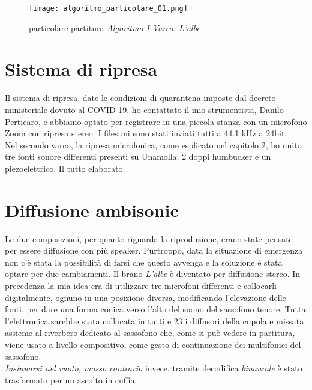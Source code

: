 \begin{figure}

\begin{center}

\texttt{[image: algoritmo\_particolare\_01.png]}

\caption{particolare partitura \textit{Algoritmo I Varco: L'albe}}

\label{fig:02_Algoritmo_01}

\end{center}

\end{figure}



\section{Sistema di ripresa}

Il sistema di ripresa, date le condizioni di quarantena imposte dal decreto ministeriale dovuto al COVID-19, ho contattato il mio strumentista, Danilo Perticaro, e abbiamo optato per registrare in una piccola stanza con un microfono Zoom con ripresa stereo. I files mi sono stati inviati tutti a 44.1 kHz a 24bit. \\
Nel secondo varco, la ripresa microfonica, come esplicato nel capitolo 2, ho unito tre fonti sonore differenti presenti su Unamolla: 2 doppi humbucker e un piezoelettrico. Il tutto elaborato.


\section{Diffusione ambisonic} 

Le due composizioni, per quanto riguarda la riproduzione, erano state pensate per essere diffusione con più speaker. Purtroppo, data la situazione di emergenza non c'è stata la possibilità di farsi che questo avvenga e la soluzione è stata optare per due cambiamenti. Il brano \textit{L'albe} è diventato per diffusione stereo. In precedenza la mia idea era di utilizzare tre microfoni differenti e collocarli digitalmente, ognuno in una posizione diversa, modificando l'elevazione delle fonti, per dare una forma conica verso l'alto del suono del sassofono tenore. Tutta l'elettronica sarebbe stata collocata in tutti e 23 i diffusori della cupola e missata assieme al riverbero dedicato al sassofono che, come si può vedere in partitura, viene usato a livello compositivo, come gesto di continuazione dei multifonici del sassofono. \\
\textit{Insinuarsi nel vuoto, mosso contrario} invece, tramite decodifica \textit{binaurale} è stato trasformato per un ascolto in cuffia.  

